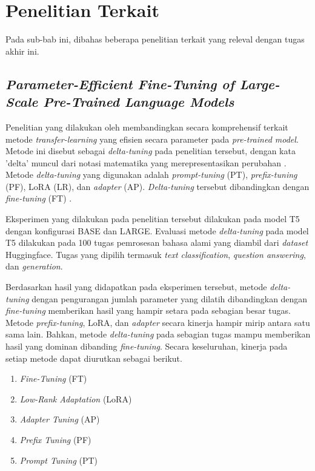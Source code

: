 \section{Penelitian Terkait}

Pada sub-bab ini,  dibahas beberapa penelitian terkait yang releval dengan tugas akhir ini.

\subsection{\textit{Parameter-Efficient Fine-Tuning of Large-Scale
Pre-Trained Language Models}}

Penelitian yang dilakukan oleh \citeauthor{peft_on_plm} membandingkan secara komprehensif terkait metode \textit{transfer-learning} yang efisien secara parameter pada \textit{pre-trained model}. Metode ini disebut sebagai \textit{delta-tuning} pada penelitian tersebut, dengan kata 'delta' muncul dari notasi matematika yang merepresentasikan perubahan \parencite{peft_on_plm}. Metode \textit{delta-tuning} yang digunakan adalah \textit{prompt-tuning} (PT), \textit{prefix-tuning} (PF), LoRA (LR), dan \textit{adapter} (AP). \textit{Delta-tuning} tersebut  dibandingkan dengan \textit{fine-tuning} (FT) .

Eksperimen yang dilakukan pada penelitian tersebut dilakukan pada model T5 dengan konfigurasi BASE dan LARGE. Evaluasi metode \textit{delta-tuning} pada model T5 dilakukan pada 100 tugas pemrosesan bahasa alami yang diambil dari \textit{dataset} Huggingface. Tugas yang dipilih termasuk \textit{text classification}, \textit{question answering}, dan \textit{generation}.

Berdasarkan hasil yang didapatkan pada eksperimen tersebut, metode \textit{delta-tuning} dengan pengurangan jumlah parameter yang dilatih dibandingkan dengan \textit{fine-tuning} memberikan hasil yang hampir setara pada sebagian besar tugas. Metode \textit{prefix-tuning}, LoRA, dan \textit{adapter} secara kinerja hampir mirip antara satu sama lain. Bahkan, metode \textit{delta-tuning} pada sebagian tugas mampu memberikan hasil yang dominan dibanding \textit{fine-tuning}. Secara keseluruhan, kinerja pada setiap metode dapat diurutkan sebagai berikut.

\begin{enumerate}
    \item \textit{Fine-Tuning} (FT)
    \item \textit{Low-Rank Adaptation} (LoRA)
    \item \textit{Adapter Tuning} (AP)
    \item \textit{Prefix Tuning} (PF)
    \item \textit{Prompt Tuning} (PT)
\end{enumerate}

